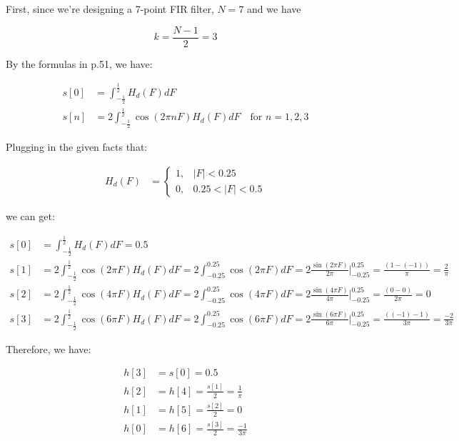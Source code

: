 \documentclass{article}
\begin{document}
First, since we're designing a 7-point FIR filter, $N = 7$ and we have

\begin{equation*}
    k = \frac{N-1}{2} = 3
\end{equation*}

By the formulas in p.51, we have:

\begin{align*}
    s[0] &= \int^{\frac{1}{2}}_{-\frac{1}{2}} H_d(F) dF \\
    s[n] &= 2\int^{\frac{1}{2}}_{-\frac{1}{2}} \cos(2\pi nF) H_d(F) dF \quad \text{for } n = 1, 2, 3
\end{align*}

Plugging in the given facts that:

\begin{align*}
    H_d(F) &= \begin{cases}
        1, & |F| < 0.25 \\
        0, & 0.25 < |F| < 0.5
    \end{cases} 
\end{align*}

we can get:

\begin{align*}
    s[0] &= \int^{\frac{1}{2}}_{-\frac{1}{2}} H_d(F) dF = 0.5 \\
    s[1] &= 2\int^{\frac{1}{2}}_{-\frac{1}{2}} \cos(2\pi F) H_d(F)dF = 2\int^{0.25}_{-0.25} \cos(2\pi F) dF = 2\frac{\sin(2\pi F)}{2\pi} \Big|^{0.25}_{-0.25} = \frac{(1-(-1))}{\pi} = \frac{2}{\pi} \\
    s[2] &= 2\int^{\frac{1}{2}}_{-\frac{1}{2}} \cos(4\pi F) H_d(F)dF = 2\int^{0.25}_{-0.25} \cos(4\pi F) dF = 2\frac{\sin(4\pi F)}{4\pi} \Big|^{0.25}_{-0.25} = \frac{(0-0)}{2\pi} = 0 \\
    s[3] &= 2\int^{\frac{1}{2}}_{-\frac{1}{2}} \cos(6\pi F) H_d(F)dF = 2\int^{0.25}_{-0.25} \cos(6\pi F) dF = 2\frac{\sin(6\pi F)}{6\pi} \Big|^{0.25}_{-0.25} = \frac{((-1)-1)}{3\pi} = \frac{-2}{3\pi}
\end{align*}

Therefore, we have:

\begin{align*}
    h[3] &= s[0] = 0.5 \\
    h[2] &= h[4] = \frac{s[1]}{2} = \frac{1}{\pi} \\
    h[1] &= h[5] = \frac{s[2]}{2} = 0 \\
    h[0] &= h[6] = \frac{s[3]}{2} = \frac{-1}{3\pi} 
\end{align*}
\end{document}
